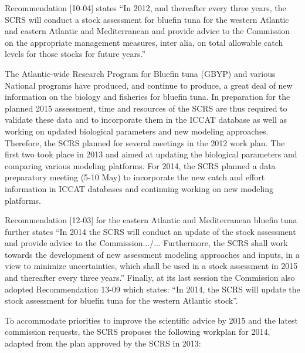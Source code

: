 Recommendation [10-04] states “In 2012, and thereafter every three years, the SCRS will conduct a stock assessment for bluefin tuna for the western Atlantic and eastern Atlantic and Mediterranean and provide advice to the Commission on the appropriate management measures, inter alia, on total allowable catch levels for those stocks for future years.” 

The Atlantic-wide Research Program for Bluefin tuna (GBYP) and various National programs have produced, and continue to produce, a great deal of new information on the biology and fisheries for bluefin tuna. In preparation for the planned 2015 assessment, time and resources of the SCRS are thus required to validate these data and to incorporate them in the ICCAT database as well as working on updated biological parameters and new modeling approaches. Therefore, the SCRS planned for several meetings in the 2012 work plan. The first two took place in 2013 and aimed at updating the biological parameters and comparing various modeling platforms. For 2014, the SCRS planned a data preparatory meeting (5-10 May) to incorporate the new catch and effort information in ICCAT databases and continuing working on new modeling platforms. 

Recommendation [12-03] for the eastern Atlantic and Mediterranean bluefin tuna further states “In 2014 the SCRS will conduct an update of the stock assessment and provide advice to the Commission.../... Furthermore, the SCRS shall work towards the development of new assessment modeling approaches and inputs, in a view to minimize uncertainties, which shall be used in a stock assessment in 2015 and thereafter every three years.” Finally, at its last session the Commission also adopted Recommendation 13-09 which states: “In 2014, the SCRS will update the stock assessment for bluefin tuna for the western Atlantic stock”.

To accommodate priorities to improve the scientific advice by 2015 and the latest commission requests, the SCRS proposes the following workplan for 2014, adapted from the plan approved by the SCRS in 2013:

